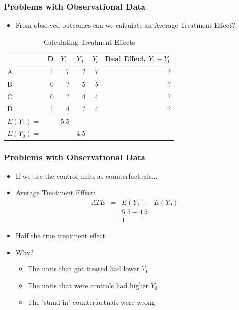 \documentclass[xcolor=x11names,compress]{beamer}\usepackage[]{graphicx}\usepackage[]{color}
\renewcommand{\(}{\begin{columns}}
\renewcommand{\)}{\end{columns}}
\newcommand{\<}[1]{\begin{column}{#1}}
\renewcommand{\>}{\end{column}}
\begin{document}
\begin{frame}
\frametitle{Problems with Observational Data}
\begin{itemize}
\item From observed outcomes can we calculate an Average Treatment Effect?
\end{itemize}
\begin{table}[htbp]
  \centering
  \caption{Calculating Treatment Effects}
    \begin{tabular}{|l|r|r|r|r|r|}
    \hline
          & \multicolumn{1}{l|}{D} & \multicolumn{1}{l|}{$Y_1$} & \multicolumn{1}{l|}{$Y_0$} & \multicolumn{1}{l|}{$Y_i$} & \multicolumn{1}{l|}{Real Effect, $Y_1 - Y_0$} \bigstrut\\
    \hline
    A     & 1     & \cellcolor{teal}7     & ?     & 7     & ? \bigstrut\\
    \hline
    B     & 0     & ?     & \cellcolor{teal}5     & 5     & ? \bigstrut\\
    \hline
    C     & 0     & ?     & \cellcolor{teal}4     & 4     & ? \bigstrut\\
    \hline
    D     & 1     & \cellcolor{teal}4     & ?     & 4     & ? \bigstrut\\
    \hline \pause
    $E(Y_1)=$ & & 5.5 & & \bigstrut\\
    \hline
    $E(Y_0)=$ & &  & 4.5 & \bigstrut\\
    \hline
    \end{tabular}%
  \label{tab:addlabel}%
\end{table}%
\end{frame}

\begin{frame}
\frametitle{Problems with Observational Data}
\begin{itemize}
\item If we use the control units as counterfactuals...
\item Average Treatment Effect:
\begin{align}
ATE &=& E(Y_1) - E(Y_0) \\
&=& 5.5 - 4.5 \\
&=& 1
\end{align}
\item Half the true treatment effect
\pause
\item Why?
\pause
\begin{itemize}
\item The units that got treated had lower $Y_1$
\item The units that were controls had higher $Y_0$
\pause
\item The 'stand-in' counterfactuals were wrong
\end{itemize}
\end{itemize}
\end{frame}
\end{document}
